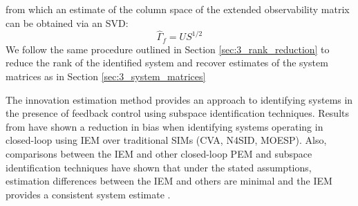 from which an estimate of the column space of the extended observability matrix can be obtained via an SVD:
\begin{equation}
\hat{\Gamma}_f = US^{1/2}
\end{equation}
We follow the same procedure outlined in Section \ref{sec:3_rank_reduction} to reduce the rank of the identified system and recover estimates of the system matrices as in Section \ref{sec:3_system_matrices}

The innovation estimation method provides an approach to identifying systems in the presence of feedback control using subspace identification techniques. Results from \cite{qin2003closed} have shown a reduction in bias when identifying systems operating in closed-loop using IEM over traditional SIMs (CVA, N4SID, MOESP). Also, comparisons between the IEM and other closed-loop PEM and subspace identification techniques have shown that under the stated assumptions, estimation differences between the IEM and others are minimal and the IEM provides a consistent system estimate \cite{van2013closed}.

































